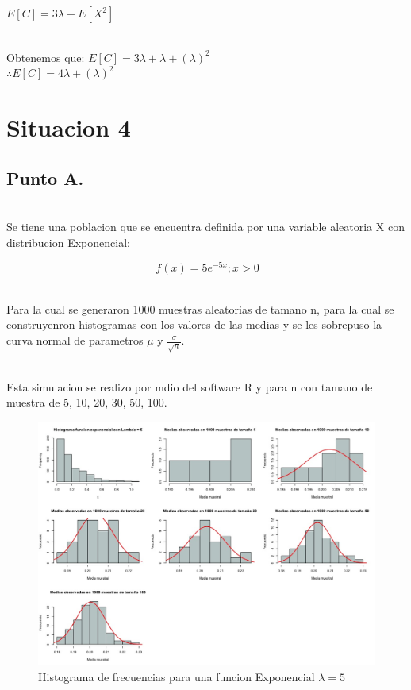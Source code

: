 \documentclass[letterpaper,12pt,onecolumn,titlepage]{article}
\begin{document}
$E[C]=3\lambda + E[X^2]$

~\\Obtenemos que: 
$E[C]=3\lambda + \lambda + (\lambda)^2$
~\\$\therefore E[C] = 4\lambda + (\lambda)^2$

\section{Situacion 4}
\subsection{Punto A.}
~\\Se tiene una poblacion que se encuentra definida por una variable aleatoria X con distribucion Exponencial:

$$\ f(x)=5e^{-5x} ; x>0$$

~\\ Para la cual se generaron 1000 muestras aleatorias de tamano n, para la cual se construyenron histogramas con los valores de las medias y se les sobrepuso la curva normal de parametros $\mu$ y $\frac{\sigma}{\sqrt{n}}$. 

~\\ Esta simulacion se realizo por mdio del software R y para n con tamano de muestra de 5, 10, 20, 30, 50, 100.

\begin{figure}[!h]
    \begin{center}
        \includegraphics[width=15cm]{figuras/4.jpeg}
        \caption{Histograma de frecuencias para una funcion Exponencial $\lambda=5$}
        \label{fig:Densidad}
    \end{center}
\end{figure}
\end{document}
